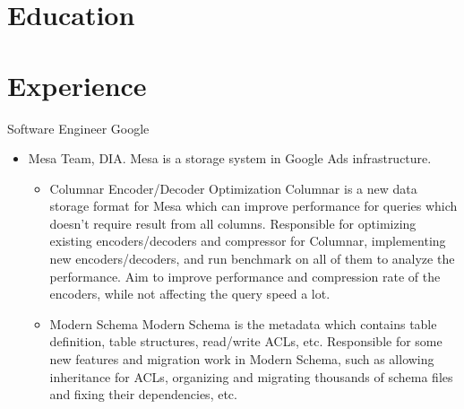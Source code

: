 \documentclass[10pt,a4paper,roman]{moderncv} %
\begin{document}
\makecvtitle

\vspace{-1cm}

\section{Education}

\section{Experience}
        {Software Engineer}
        {}
        {Google}
        {}
        {\begin{itemize}%
         \item Mesa Team, DIA.
               Mesa\footnotemark[1]{} is a storage system in Google Ads infrastructure.
               \begin{itemize}%
               \item Columnar Encoder/Decoder Optimization\newline{}%
                     Columnar is a new data storage format for Mesa which can improve performance for queries which doesn't require result from all columns.
                     Responsible for optimizing existing encoders/decoders and compressor for Columnar, implementing new encoders/decoders, and run benchmark on all of them to analyze the performance.
                     Aim to improve performance and compression rate of the encoders, while not affecting the query speed a lot.
               \item Modern Schema\newline{}%
                     Modern Schema is the metadata which contains table definition, table structures, read/write ACLs, etc.
                     Responsible for some new features and migration work in Modern Schema, such as allowing inheritance for ACLs, organizing and migrating thousands of schema files and fixing their dependencies, etc.
               \end{itemize}
         \end{itemize}}
\end{document}
